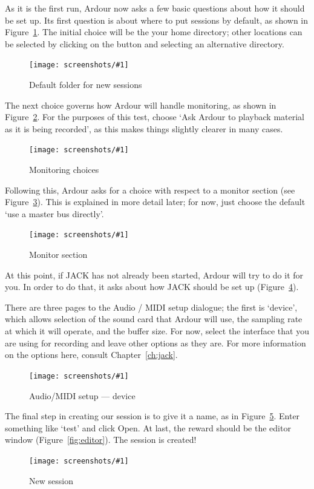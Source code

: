 \documentclass[10pt,a4paper]{book}
\newcommand{\button}[1]{#1}
\newcommand{\screenshot}[3]{%
\begin{figure}[ht]%
\begin{center}
\texttt{[image: screenshots/\#1]}
\end{center}
\caption{#2}
\label{#3}
\end{figure}}
\begin{document}
{As it is the first run, Ardour now asks a few basic questions about
how it should be set up.  Its first question is about where to put
sessions by default, as shown in
Figure~\ref{fig:default-folder-for-new-sessions}.  The initial choice
will be the your home directory; other locations can be selected by
clicking on the button and selecting an alternative directory.

\screenshot{default-folder-for-new-sessions.png}{Default folder for new sessions}{fig:default-folder-for-new-sessions}

The next choice governs how Ardour will handle monitoring, as shown in
Figure~\ref{fig:monitoring-choices}.  For the purposes of this test,
choose `Ask Ardour to playback material as it is being recorded', as
this makes things slightly clearer in many cases.

\screenshot{monitoring-choices.png}{Monitoring choices}{fig:monitoring-choices}

Following this, Ardour asks for a choice with respect to a monitor
section (see Figure~\ref{fig:monitor-section}).  This is explained in
more detail later; for now, just choose the default `use a master bus
directly'.

\screenshot{monitor-section.png}{Monitor section}{fig:monitor-section}

At this point, if JACK has not already been started, Ardour will try
to do it for you.  In order to do that, it asks about how JACK should
be set up (Figure~\ref{fig:audio-midi-setup-device}).

There are three pages to the Audio / MIDI setup dialogue; the first is
`device', which allows selection of the sound card that Ardour will
use, the sampling rate at which it will operate, and the buffer size.
For now, select the interface that you are using for recording and
leave other options as they are.  For more information on the options
here, consult Chapter~\ref{ch:jack}.

\screenshot{audio-midi-setup-device.png}{Audio/MIDI setup --- device}{fig:audio-midi-setup-device}

The final step in creating our session is to give it a name, as in
Figure~\ref{fig:new-session}.  Enter something like `test' and click
\button{Open}.  At last, the reward should be the editor window
(Figure~\ref{fig:editor}).  The session is created!

\screenshot{new-session.png}{New session}{fig:new-session}

}
\end{document}
